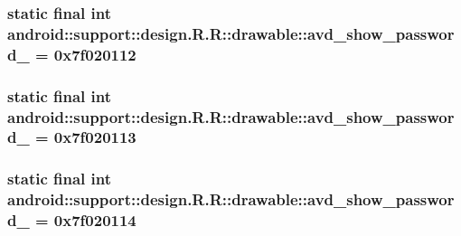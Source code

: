 \hypertarget{classandroid_1_1support_1_1design_1_1_r_1_1drawable_3949e1522ac8798b5fe1e403833ea9fb}{
\subsubsection[{avd\_\-show\_\-password\_\-1}]{\setlength{\rightskip}{0pt plus 5cm}static final int android::support::design.R.R::drawable::avd\_\-show\_\-password\_ = 0x7f020112}}
\label{classandroid_1_1support_1_1design_1_1_r_1_1drawable_3949e1522ac8798b5fe1e403833ea9fb}


\hypertarget{classandroid_1_1support_1_1design_1_1_r_1_1drawable_086a196f1b293c3b73991907288870d4}{
\subsubsection[{avd\_\-show\_\-password\_\-2}]{\setlength{\rightskip}{0pt plus 5cm}static final int android::support::design.R.R::drawable::avd\_\-show\_\-password\_ = 0x7f020113}}
\label{classandroid_1_1support_1_1design_1_1_r_1_1drawable_086a196f1b293c3b73991907288870d4}


\hypertarget{classandroid_1_1support_1_1design_1_1_r_1_1drawable_b8dd677d744ade8b36064a5ba5abe2b4}{
\subsubsection[{avd\_\-show\_\-password\_\-3}]{\setlength{\rightskip}{0pt plus 5cm}static final int android::support::design.R.R::drawable::avd\_\-show\_\-password\_ = 0x7f020114}}
\label{classandroid_1_1support_1_1design_1_1_r_1_1drawable_b8dd677d744ade8b36064a5ba5abe2b4}


